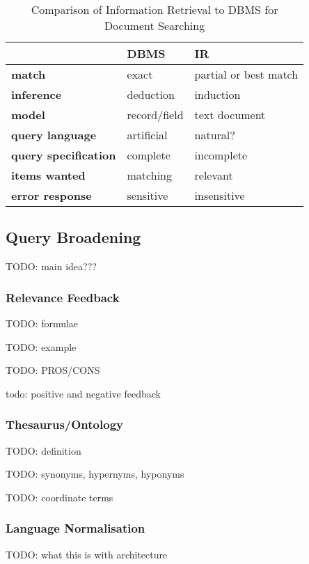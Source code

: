 \documentclass{article}
\begin{document}
\begin{table}
	\centering
	\begin{tabular}{|l|l|l|}
		\hline
		& \textbf{DBMS} & \textbf{IR} \\
		\hline
		\textbf{match} & exact & partial or best match \\
		\textbf{inference} & deduction & induction \\
		\textbf{model} & record/field & text document \\
		\textbf{query language} & artificial & natural? \\
		\textbf{query specification} & complete & incomplete \\
		\textbf{items wanted} & matching & relevant \\
		\textbf{error response} & sensitive & insensitive \\
		\hline
	\end{tabular}
	\caption{Comparison of Information Retrieval to DBMS for Document Searching}
	\label{tab:ir-db-comparison}
\end{table}

\subsection{Query Broadening}

TODO: main idea???

\subsubsection{Relevance Feedback}

TODO: formulae

TODO: example

TODO: PROS/CONS

todo: positive and negative feedback

\subsubsection{Thesaurus/Ontology}

TODO: definition

TODO: synonyms, hypernyms, hyponyms

TODO: coordinate terms

\subsubsection{Language Normalisation}

TODO: what this is with architecture
\end{document}
